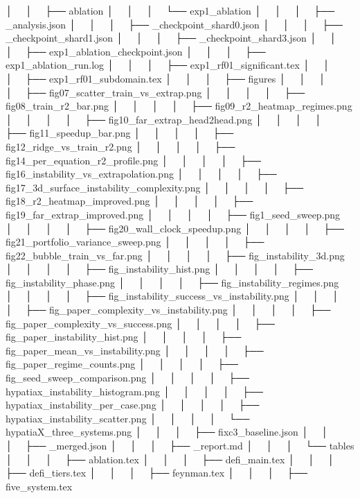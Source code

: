 │   │       ├── ablation
│   │       │   └── exp1_ablation
│   │       │       ├── _analysis.json
│   │       │       ├── _checkpoint_shard0.json
│   │       │       ├── _checkpoint_shard1.json
│   │       │       ├── _checkpoint_shard3.json
│   │       │       ├── exp1_ablation_checkpoint.json
│   │       │       ├── exp1_ablation_run.log
│   │       │       ├── exp1_rf01_significant.tex
│   │       │       ├── exp1_rf01_subdomain.tex
│   │       │       ├── figures
│   │       │       │   ├── fig07_scatter_train_vs_extrap.png
│   │       │       │   ├── fig08_train_r2_bar.png
│   │       │       │   ├── fig09_r2_heatmap_regimes.png
│   │       │       │   ├── fig10_far_extrap_head2head.png
│   │       │       │   ├── fig11_speedup_bar.png
│   │       │       │   ├── fig12_ridge_vs_train_r2.png
│   │       │       │   ├── fig14_per_equation_r2_profile.png
│   │       │       │   ├── fig16_instability_vs_extrapolation.png
│   │       │       │   ├── fig17_3d_surface_instability_complexity.png
│   │       │       │   ├── fig18_r2_heatmap_improved.png
│   │       │       │   ├── fig19_far_extrap_improved.png
│   │       │       │   ├── fig1_seed_sweep.png
│   │       │       │   ├── fig20_wall_clock_speedup.png
│   │       │       │   ├── fig21_portfolio_variance_sweep.png
│   │       │       │   ├── fig22_bubble_train_vs_far.png
│   │       │       │   ├── fig_instability_3d.png
│   │       │       │   ├── fig_instability_hist.png
│   │       │       │   ├── fig_instability_phase.png
│   │       │       │   ├── fig_instability_regimes.png
│   │       │       │   ├── fig_instability_success_vs_instability.png
│   │       │       │   ├── fig_paper_complexity_vs_instability.png
│   │       │       │   ├── fig_paper_complexity_vs_success.png
│   │       │       │   ├── fig_paper_instability_hist.png
│   │       │       │   ├── fig_paper_mean_vs_instability.png
│   │       │       │   ├── fig_paper_regime_counts.png
│   │       │       │   ├── fig_seed_sweep_comparison.png
│   │       │       │   ├── hypatiax_instability_histogram.png
│   │       │       │   ├── hypatiax_instability_per_case.png
│   │       │       │   ├── hypatiax_instability_scatter.png
│   │       │       │   └── hypatiaX_three_systems.png
│   │       │       ├── fixc3_baseline.json
│   │       │       ├── _merged.json
│   │       │       ├── _report.md
│   │       │       └── tables
│   │       │           ├── ablation.tex
│   │       │           ├── defi_main.tex
│   │       │           ├── defi_tiers.tex
│   │       │           ├── feynman.tex
│   │       │           ├── five_system.tex
